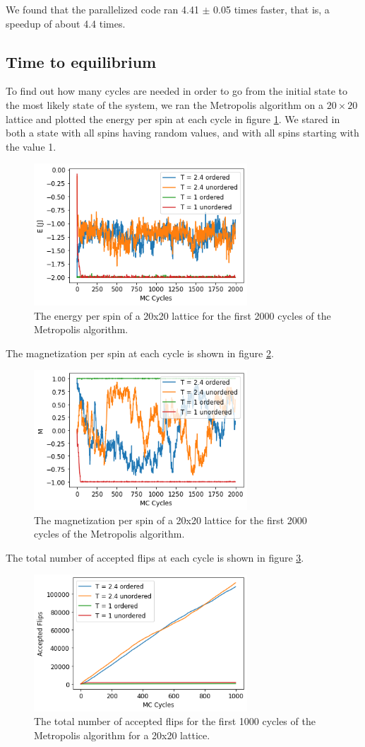 \documentclass[reprint,english,notitlepage]{revtex4-1}
\begin{document}
	We found that the parallelized code ran 4.41 $\pm$ 0.05 times faster, that is, a speedup of about 4.4 times.

\subsection{Time to equilibrium}
	To find out how many cycles are needed in order to go from the initial state to the most likely state of the system, we ran the Metropolis algorithm on a $20 \times 20$ lattice and plotted the energy per spin at each cycle in figure \ref{fig:EMC}. We stared in both a state with all spins having random values, and with all spins starting with the value 1.
	\begin{figure}[H]
		\includegraphics[width=80mm]{../../Code/Figures/EMC.png}
		\caption{The energy per spin of a 20x20 lattice for the first 2000 cycles of the Metropolis algorithm.}
		\label{fig:EMC}
	\end{figure}
	The magnetization per spin at each cycle is shown in figure \ref{fig:MMC}.
	\begin{figure}[H]
		\includegraphics[width=80mm]{../../Code/Figures/MMC.png}
		\caption{The magnetization per spin of a 20x20 lattice for the first 2000 cycles of the Metropolis algorithm.}
		\label{fig:MMC}
	\end{figure}
	The total number of accepted flips at each cycle is shown in figure \ref{fig:AMC}.
	\begin{figure}[H]
		\includegraphics[width=80mm]{../../Code/Figures/AMC.png}
		\caption{The total number of accepted flips for the first 1000 cycles of the Metropolis algorithm for a 20x20 lattice.}
		\label{fig:AMC}
	\end{figure}
\end{document}
